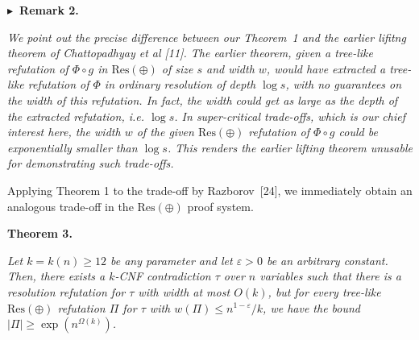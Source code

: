 \documentclass[10pt,a4paper]{article}
\begin{document}




\par\medskip\noindent\textbf{
$\blacktriangleright$ Remark 2.
}\par



\emph{We point out the precise difference between our Theorem 1 and the earlier lifitng theorem of Chattopadhyay et al [11]. The earlier theorem, given a tree-like refutation of $\Phi\circ g$ in $\text{Res}(\oplus)$ of size $s$ and width $w$, would have extracted a tree-like refutation of $\Phi$ in ordinary resolution of depth $\log s$, with no guarantees on the width of this refutation. In fact, the width could get as large as the depth of the extracted refutation, i.e. $\log s$. In super-critical trade-offs, which is our chief interest here, the width $w$ of the given $\text{Res}(\oplus)$ refutation of $\Phi\circ g$ could be exponentially smaller than $\log s$. This renders the earlier lifting theorem unusable for demonstrating such trade-offs.}\par






Applying Theorem 1 to the trade-off by Razborov [24], we immediately obtain an analogous trade-off in the $\text{Res}(\oplus)$ proof system.\par





\par\medskip\noindent\textbf{
\textbf{Theorem 3}\textbf{.}
}\par



\emph{Let $k=k(n)\geq 12$ be any parameter and let $\varepsilon>0$ be an arbitrary constant.
Then, there exists a $k$-CNF contradiction $\tau$ over $n$ variables such that there is a resolution refutation for $\tau$ with width at most $O(k)$, but for every tree-like $\text{Res}(\oplus)$ refutation $\Pi$ for $\tau$ with $w(\Pi)\leq n^{1-\varepsilon}/k$, we have the bound $|\Pi|\geq\exp(n^{\Omega(k)})$.}\par



\end{document}
